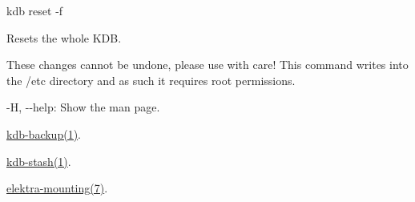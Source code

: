 {\ttfamily kdb reset -\/f}

Resets the whole K\+DB.

These changes cannot be undone, please use with care! This command writes into the {\ttfamily /etc} directory and as such it requires root permissions.


\begin{DoxyItemize}
\item {\ttfamily -\/H}, {\ttfamily -\/-\/help}\+: Show the man page.
\end{DoxyItemize}


\begin{DoxyItemize}
\item \hyperlink{doc_help_kdb-backup_md}{kdb-\/backup(1)}.
\item \hyperlink{doc_help_kdb-stash_md}{kdb-\/stash(1)}.
\item \hyperlink{doc_help_elektra-mounting_md}{elektra-\/mounting(7)}. 
\end{DoxyItemize}